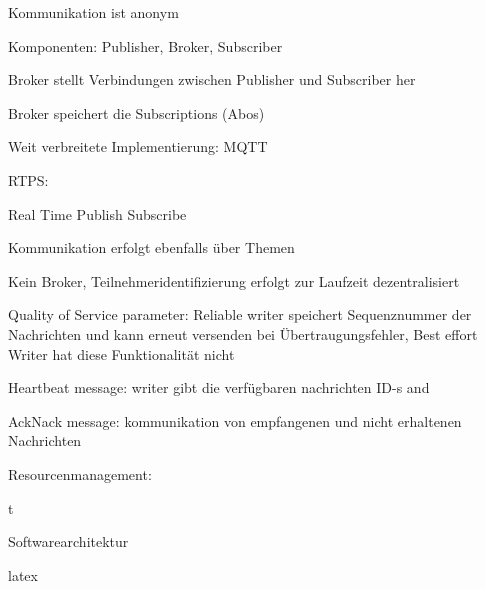 \begin{notes}
\begin{notes}
\begin{notes}
                \item Kommunikation ist anonym
                \item Komponenten: Publisher, Broker, Subscriber
                \item Broker stellt Verbindungen zwischen Publisher und Subscriber her
                \item Broker speichert die Subscriptions (Abos)
                \item Weit verbreitete Implementierung: MQTT
                \item RTPS:
                \begin{notes}
                    \item Real Time Publish Subscribe
                    \item Kommunikation erfolgt ebenfalls über Themen
                    \item Kein Broker, Teilnehmeridentifizierung erfolgt zur Laufzeit dezentralisiert
                    \item Quality of Service parameter: Reliable writer speichert Sequenznummer der Nachrichten und kann erneut versenden bei Übertraugungsfehler, Best effort Writer hat diese Funktionalität nicht
                    \item Heartbeat message: writer gibt die verfügbaren nachrichten ID-s and
                    \item AckNack message: kommunikation von empfangenen und nicht erhaltenen Nachrichten
                \end{notes}
            \end{notes}
    \end{notes}
    \item Resourcenmanagement:
    \begin{notes}
        \item t
    \end{notes}
    \item Softwarearchitektur
    \item \Gls{latex}
\end{notes}



